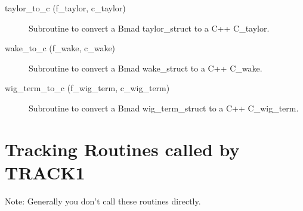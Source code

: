 \begin{description}
\item[taylor\_to\_c (f\_taylor, c\_taylor)] \Newline 
Subroutine to convert a Bmad taylor\_struct to a C++ C\_taylor.

\item[wake\_to\_c (f\_wake, c\_wake)] \Newline 
Subroutine to convert a Bmad wake\_struct to a C++ C\_wake.

\item[wig\_term\_to\_c (f\_wig\_term, c\_wig\_term)] \Newline 
Subroutine to convert a Bmad wig\_term\_struct to a C++ C\_wig\_term.

\end{description}

\section{Tracking Routines called by TRACK1}
\label{r:track1}   

Note: Generally you don't call these routines directly.

